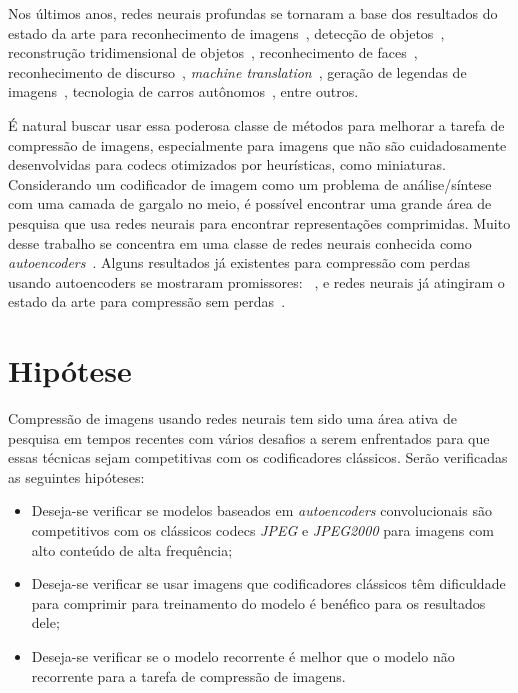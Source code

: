Nos últimos anos, redes neurais profundas se tornaram a base dos resultados do estado da arte para reconhecimento de imagens~\cite{simonyan}, detecção de objetos~\cite{girshick2014rich}, reconstrução tridimensional de objetos~\cite{choy20163d}, reconhecimento de faces~\cite{deepface}, reconhecimento de discurso~\cite{graves}, \textit{machine translation}~\cite{sequence}, geração de legendas de imagens~\cite{vinyals2015show}, tecnologia de carros autônomos~\cite{huval2015empirical}, entre outros. 

É natural buscar usar essa poderosa classe de métodos para melhorar a tarefa de compressão de imagens, especialmente para imagens que não são cuidadosamente desenvolvidas para codecs otimizados por heurísticas, como miniaturas. Considerando um codificador de imagem como um problema de análise/síntese com uma camada de gargalo no meio, é possível encontrar uma grande área de pesquisa que usa redes neurais para encontrar representações comprimidas. Muito desse trabalho se concentra em uma classe de redes neurais conhecida como \emph{autoencoders}~\cite{autoencoder2011}. Alguns resultados já existentes para compressão com perdas usando autoencoders se mostraram promissores: ~\cite{gregor2016towards, FullResolution2017Toderici, Variable2016Toderici}, e redes neurais já atingiram o estado da arte para compressão sem perdas~\cite{mentzer2019, theis2015generative}. 
\section{Hipótese}
\label{sec:hipotese}
Compressão de imagens usando redes neurais tem sido uma área ativa de pesquisa em tempos recentes com vários desafios a serem enfrentados para que essas técnicas sejam competitivas com os codificadores clássicos. Serão verificadas as seguintes hipóteses:
\begin{itemize}
    \item Deseja-se verificar se modelos baseados em \textit{autoencoders} convolucionais são competitivos com os clássicos codecs \textit{JPEG} e \textit{JPEG2000} para imagens com alto conteúdo de alta frequência;
    \item Deseja-se verificar se usar imagens que codificadores clássicos têm dificuldade para comprimir para treinamento do modelo é benéfico para os resultados dele;
    \item Deseja-se verificar se o modelo recorrente é melhor que o modelo não recorrente para a tarefa de compressão de imagens.
\end{itemize}

